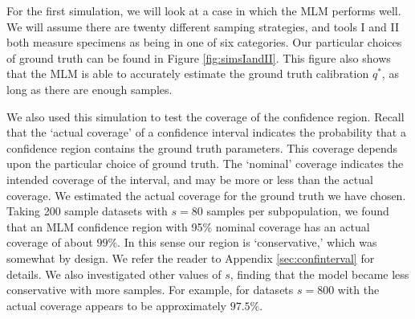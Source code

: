 
For the first simulation, we will look at a case in which the MLM performs well.  We will assume there are twenty different samping strategies, and tools I and II both measure specimens as being in one of six categories.  Our particular choices of ground truth can be found in Figure \ref{fig:simsIandII}.    This figure also shows that the MLM is able to accurately estimate the ground truth calibration $q^*$, as long as there are enough samples.

We also used this simulation to test the coverage of the confidence region.  Recall that the `actual coverage' of a confidence interval indicates the probability that a confidence region contains the ground truth parameters.  This coverage depends upon the particular choice of ground truth.  The `nominal' coverage indicates the intended coverage of the interval, and may be more or less than the actual coverage.  We estimated the actual coverage for the ground truth we have chosen.  Taking 200 sample datasets with $s=80$ samples per subpopulation, we found that an MLM confidence region with 95\% nominal coverage has an actual coverage of about $99\%$.  In this sense our region is `conservative,' which was somewhat by design.  We refer the reader to Appendix \ref{sec:confinterval} for details.  We also investigated other values of $s$, finding that the model became less conservative with more samples.  For example, for datasets $s=800$ with the actual coverage appears to be approximately $97.5\%$.

